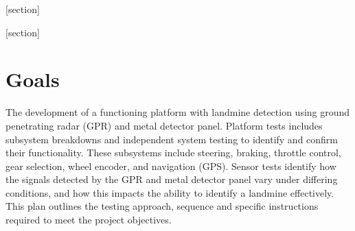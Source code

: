 \documentclass[main.tex]{subfiles}
\begin{document}
\begin{appendices}
[section]
\renewcommand*{\thegpr}{%
  \ifnum\value{gpr}<1 0 \fi%
  \arabic{gpr}%
}
\newenvironment{gpr}[1][]{\refstepcounter{gpr}\par\medskip\indent{}
   \textbf{TC 2.\thegpr:#1} \rmfamily}{\bigskip}

[section]
\renewcommand*{\themds}{%
  \ifnum\value{mds}<1 0 \fi%
  \arabic{mds}%
}
\newenvironment{mds}[1][]{\refstepcounter{mds}\par\medskip\indent{}
   \textbf{TC 3.\themds:#1} \rmfamily}{\bigskip}

\section{Goals}
The development of a functioning platform with landmine detection using ground penetrating radar (GPR) and metal detector panel. Platform tests includes subsystem breakdowns and independent system testing to identify and confirm their functionality. These subsystems include steering, braking, throttle control, gear selection, wheel encoder, and navigation (GPS). Sensor tests identify how the signals detected by the GPR and metal detector panel vary under differing conditions, and how this impacts the ability to identify a landmine effectively. This plan outlines the testing approach, sequence and specific instructions required to meet the project objectives. 




\end{appendices}
\end{document}
